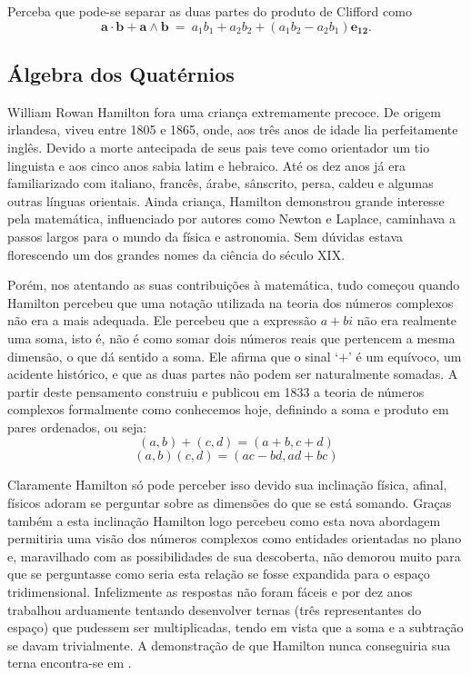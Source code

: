 \documentclass[a4paper,12pt]{report}
\theoremstyle{plain}
\theoremstyle{definition}
\begin{document}
Perceba que pode-se separar as duas partes do produto de Clifford como $$\mathbf{a\cdot b} + \mathbf{a \wedge b} \ = \ a_1b_1 + a_2b_2 + (a_1b_2 - a_2b_1)\mathbf{e_{12}}.$$

\subsection{Álgebra dos Quatérnios}
William Rowan Hamilton fora uma criança extremamente precoce. De origem irlandesa, viveu entre 1805 e 1865, onde, aos três anos de idade lia perfeitamente inglês. Devido a morte antecipada de seus pais teve como orientador um tio linguista e aos cinco anos sabia latim e hebraico. Até os dez anos já era familiarizado com italiano, francês, árabe, sânscrito, persa, caldeu e algumas outras línguas orientais. Ainda criança, Hamilton demonstrou grande interesse pela matemática, influenciado por autores como Newton e Laplace, caminhava a passos largos para o mundo da física e astronomia. Sem dúvidas estava florescendo um dos grandes nomes da ciência do século XIX. \cite{BoyerMathHistory,AlgebraAbstrata2BienalSBM}

Porém, nos atentando as suas contribuições à matemática, tudo começou quando Hamilton percebeu que uma notação utilizada na teoria dos números complexos não era a mais adequada. Ele percebeu que a expressão $a + bi$ não era realmente uma soma, isto é, não é como somar dois números reais que pertencem a mesma dimensão, o que dá sentido a soma. Ele afirma que o sinal ‘$+$’ é um equívoco, um acidente histórico, e que as duas partes não podem ser naturalmente somadas. A partir deste pensamento construiu e publicou em 1833 a teoria de números complexos formalmente como conhecemos hoje, definindo a soma e produto em pares ordenados, ou seja:
\begin{equation*}
	(a,b) + (c,d) = (a + b, c + d)
\end{equation*}
\begin{equation*}
	(a, b)(c, d) = (ac-bd, ad + bc)
\end{equation*}

Claramente Hamilton só pode perceber isso devido sua inclinação física, afinal, físicos adoram se perguntar sobre as dimensões do que se está somando. Graças também a esta inclinação Hamilton logo percebeu como esta nova abordagem permitiria uma visão dos números complexos como entidades orientadas no plano e, maravilhado com as possibilidades de sua descoberta, não demorou muito para que se perguntasse como seria esta relação se fosse expandida para o espaço tridimensional. Infelizmente as respostas não foram fáceis e por dez anos trabalhou arduamente tentando desenvolver ternas (três representantes do espaço) que pudessem ser multiplicadas, tendo em vista que a soma e a subtração se davam trivialmente. A demonstração de que Hamilton nunca conseguiria sua terna encontra-se em \cite{QuaterniosJucineide}. 
\end{document}
